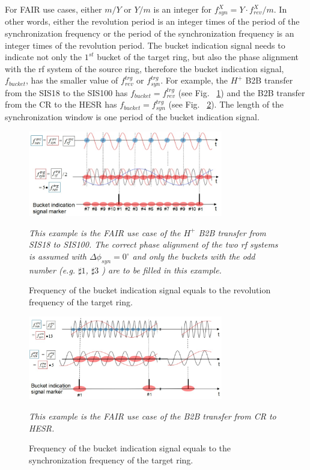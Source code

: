 For FAIR use cases, either $m/Y$ or $Y/m$ is an integer for $f_\mathit{syn}^{X}=Y\cdot f_\mathit{rev}^{X}/m$. In other words, either the revolution period is an integer times of the period of the synchronization frequency or the period of the synchronization frequency is an integer times of the revolution period. The bucket indication signal needs to indicate not only the $1^\mathit{st}$ bucket of the target ring, but also the phase alignment with the rf system of the source ring, therefore the bucket indication signal, $f_\mathit{bucket}$, has the smaller value of $f_\mathit{rev}^{trg}$ or $f_\mathit{syn}^{trg}$. For example, the $H^+$ B2B transfer from the SIS18 to the SIS100 has $f_\mathit{bucket}=f_\mathit{rev}^{trg}$ (see Fig. ~\ref{bucket_label_occurrence}) and the B2B transfer from the CR to the HESR has $f_\mathit{bucket}=f_\mathit{syn}^{trg}$ (see Fig. ~\ref{bucket_label_occurrence1}). The length of the synchronization window is one period of the bucket indication signal.
\begin{figure}[!htb]
   \centering   
   \includegraphics*[width=85mm]{bucket_label_occurrence.jpg}
   \caption{Frequency of the bucket indication signal equals to the revolution frequency of the target ring.}
	{\textsl{\small{This example is the FAIR use case of the $H^+$ B2B transfer from SIS18 to SIS100. The correct phase alignment of the two rf systems is assumed with $\Delta\phi_\mathit{syn}=0^\circ$ and only the buckets with the odd number (e.g. $\sharp1$, $\sharp3$ ) are to be filled in this example.}}}
   \label{bucket_label_occurrence}
\end{figure}

\begin{figure}[!htb]
   \centering   
   \includegraphics*[width=85mm]{bucket_label_occurrence1.jpg}
   \caption{Frequency of the bucket indication signal equals to the synchronization frequency of the target ring.}
	{\textsl{\small{This example is the FAIR use case of the B2B transfer from CR to HESR. }}}
   \label{bucket_label_occurrence1}
\end{figure}


